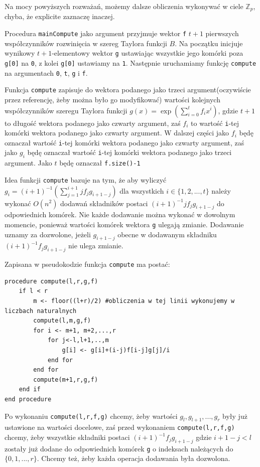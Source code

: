 \documentclass{article}
\begin{document}
Na mocy powyższych rozważań, możemy dalsze obliczenia wykonywać w ciele $\mathbb{Z}_p$, chyba, że explicite zaznaczę inaczej.


Procedura \texttt{mainCompute} jako argument przyjmuje wektor \texttt{f} $t+1$ pierwszych współczynników rozwinięcia w 
szereg Taylora funkcji $B$. Na początku inicjuje wynikowy $t+1$-elementowy wektor \texttt{g} ustawiając wszystkie
jego komórki poza \texttt{g[0]} na \texttt{0}, z kolei \texttt{g[0]} ustawiamy na \texttt{1}. Następnie uruchamiamy funkcję 
\texttt{compute} na argumentach \texttt{0}, \texttt{t}, \texttt{g} i \texttt{f}.

Funkcja \texttt{compute} zapisuje do wektora podanego jako trzeci argument(oczywiście przez referencję, żeby 
można było go modyfikować) wartości kolejnych współczynników szeregu Taylora funkcji 
$g(x)=\exp(\sum_{i=0}^tf_ix^i)$, gdzie $t+1$ to długość wektora podanego jako czwarty argument, zaś
$f_i$ to wartość \texttt{i}-tej komórki wektora podanego jako czwarty argument. W dalszej części jako $f_i$ będę 
oznaczał wartość \texttt{i}-tej komórki wektora podanego jako czwarty argument, zaś jako $g_i$ będę oznaczał wartość 
\texttt{i}-tej komórki wektora podanego jako trzeci argument. Jako $t$ będę oznaczał \texttt{f.size()-1}

Idea funkcji \texttt{compute} bazuje na tym, że aby wyliczyć $g_i=(i+1)^{-1}(\sum_{j=1}^{i+1}jf_jg_{i+1-j})$ dla wszystkich $i \in \{1,2,...,t\}$ należy
wykonać $O(n^2)$ dodawań składników postaci $(i+1)^{-1}jf_jg_{i+1-j}$ do odpowiednich komórek. Nie każde dodawanie można wykonać w dowolnym
momencie, ponieważ wartości komórek wektora \texttt{g} ulegają zmianie. Dodawanie uznamy za dozwolone, jeżeli $g_{i+1-j}$ obecne w 
dodawanym składniku $(i+1)^{-1}f_jg_{i+1-j}$ nie ulega zmianie. 

Zapisana w pseudokodzie funkcja \texttt{compute} ma postać:

\begin{verbatim}
procedure compute(l,r,g,f)
    if l < r
        m <- floor((l+r)/2) #obliczenia w tej linii wykonujemy w liczbach naturalnych
        compute(l,m,g,f)
        for i <- m+1, m+2,...,r
            for j<-l,l+1,..,m
                g[i] <- g[i]+(i-j)f[i-j]g[j]/i
            end for
        end for
        compute(m+1,r,g,f)
    end if
end procedure
\end{verbatim}

Po wykonaniu \texttt{compute(l,r,f,g)} chcemy, żeby wartości $g_l,g_{l+1},...,g_{r}$ były już ustawione na wartości docelowe, zaś
przed wykonaniem \texttt{compute(l,r,f,g)} chcemy, żeby wszystkie składniki postaci $(i+1)^{-1}f_jg_{i+1-j}$ gdzie $i+1-j<l$ zostały
już dodane do odpowiednich komórek \texttt{g} o indeksach należących do $\{0,1,...,r\}$. Chcemy też, żeby każda operacja dodawania
była dozwolona. 
\end{document}

